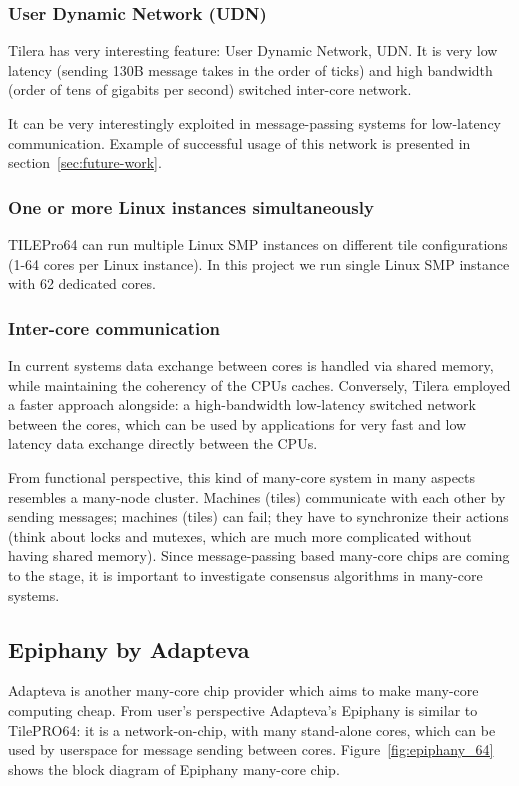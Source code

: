 \documentclass[english,11pt]{l4proj}
\begin{document}
\subsubsection{User Dynamic Network (UDN)}
Tilera has very interesting feature: User Dynamic Network, UDN. It is very low
latency (sending 130B message takes in the order of ticks) and high bandwidth
(order of tens of gigabits per second) switched inter-core network.

It can be very interestingly exploited in message-passing systems for
low-latency communication. Example of successful usage of this network is
presented in section~\ref{sec:future-work}.

\subsubsection{One or more Linux instances simultaneously}
TILEPro64 can run multiple Linux SMP instances on different tile configurations
(1-64 cores per Linux instance). In this project we run single Linux SMP
instance with 62 dedicated cores.

\subsubsection{Inter-core communication}
In current systems data exchange between cores is handled via shared memory,
while maintaining the coherency of the CPUs caches. Conversely, Tilera employed
a faster approach alongside: a high-bandwidth low-latency switched network
between the cores, which can be used by applications for very fast and low
latency data exchange directly between the CPUs\cite{tile64}.

From functional perspective, this kind of many-core system in many aspects
resembles a many-node cluster. Machines (tiles) communicate with each other by
sending messages; machines (tiles) can fail; they have to synchronize their
actions (think about locks and mutexes, which are much more complicated without
having shared memory). Since message-passing based many-core chips are coming to
the stage, it is important to investigate consensus algorithms in many-core
systems.

\subsection{Epiphany by Adapteva}

Adapteva is another many-core chip provider which aims to make many-core
computing cheap\cite{parallella-kickstarter}. From user's perspective
Adapteva's Epiphany\cite{epiphany} is similar to TilePRO64: it is a
network-on-chip, with many stand-alone cores, which can be used by userspace for
message sending between cores.  Figure~\ref{fig:epiphany_64} shows the block
diagram of Epiphany many-core chip.
\end{document}
